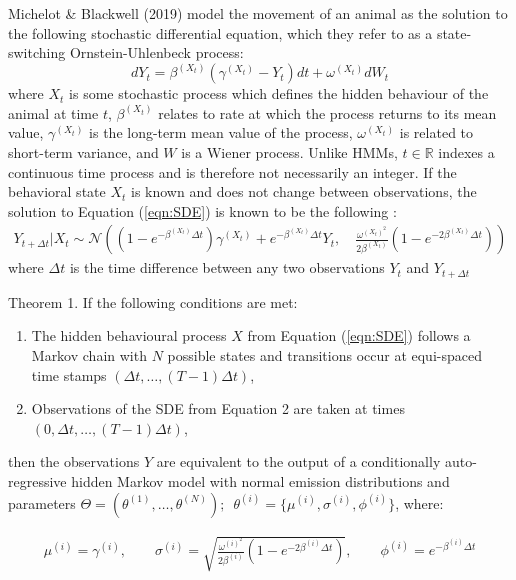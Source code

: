 
\renewcommand*{\thesubsection}{\Alph{subsection}}

Michelot \& Blackwell (2019) model the movement of an animal as the solution to the following stochastic differential equation, which they refer to as a state-switching Ornstein-Uhlenbeck process:
%
\begin{equation}
    \label{eqn:SDE}
    dY_t = \beta^{(X_t)}(\gamma^{(X_t)} - Y_t)dt + \omega^{(X_t)} dW_t
\end{equation}
%
where $X_t$ is some stochastic process which defines the hidden behaviour of the animal at time $t$, $\beta^{(X_t)}$ relates to rate at which the process returns to its mean value, $\gamma^{(X_t)}$ is the long-term mean value of the process, $\omega^{(X_t)}$ is related to short-term variance, and $W$ is a Wiener process. Unlike HMMs, $t \in \mathbb{R}$ indexes a continuous time process and is therefore not necessarily an integer. If the behavioral state $X_t$ is known and does not change between observations, the solution to Equation (\ref{eqn:SDE}) is known to be the following \citep{Michelot:2019}:
%
\begin{align}
    Y_{t+\Delta t} | X_{t} \sim \mathcal{N}\left((1-e^{-\beta^{(X_t)}\Delta t})\gamma^{(X_t)} + e^{-\beta^{(X_t)}\Delta t} Y_t,\quad \frac{\omega^{(X_t)^2}}{2\beta^{(X_t)}} (1-e^{-2\beta^{(X_t)}\Delta t})\right)
    \label{eqn:OU_sol}
\end{align}
%
where $\Delta t$ is the time difference between any two observations $Y_t$ and $Y_{t+\Delta t}$

\begin{theorem}{Theorem 1.}{}%
If the following conditions are met:
\begin{enumerate}
    \item The hidden behavioural process $X$ from Equation (\ref{eqn:SDE}) follows a Markov chain with $N$ possible states and transitions occur at equi-spaced time stamps $\left(\Delta t, \ldots, (T-1)\Delta t\right)$,
    
    \item Observations of the SDE from Equation 2 are taken at times $\left(0, \Delta t, \ldots, (T-1)\Delta t\right)$,
\end{enumerate}
then the observations $Y$ are equivalent to the output of a conditionally auto-regressive hidden Markov model with normal emission distributions and parameters $\Theta = (\theta^{(1)}, \ldots, \theta^{(N)}); \enspace \theta^{(i)} = \{\mu^{(i)},\sigma^{(i)},\phi^{(i)}\}$, where:

\begin{align}
\mu^{(i)} = \gamma^{(i)}, \qquad \sigma^{(i)} = \sqrt{\frac{\omega^{(i)^2}}{2\beta^{(i)}} (1-e^{-2\beta^{(i)}\Delta t})}, \qquad \phi^{(i)} = e^{-\beta^{(i)}\Delta t} \label{eqn:CarHMM_to_OU}
\end{align}

\end{theorem}

